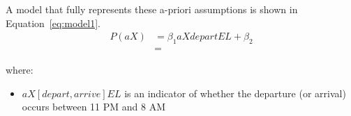 A model that fully represents these a-priori assumptions is shown in Equation~\ref{eq:model1}.
\begin{align}
    P(aX) &= \beta_1 aXdepartEL + \beta_2 \\
    &=
\end{align}

where:
\begin{itemize}
    \item $aX[depart,arrive]EL$ is an indicator of whether the departure (or arrival) occurs between 11 PM and 8 AM
    
\end{itemize}